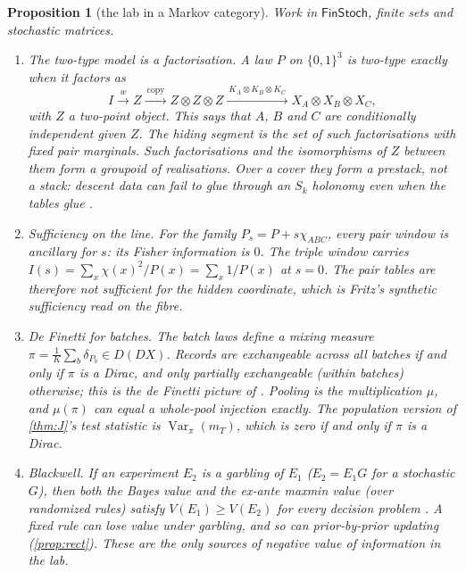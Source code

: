 \documentclass[11pt]{article}
\newtheorem{proposition}{Proposition}\newtheorem{corollary}{Corollary}\newtheorem{lemma}{Lemma}
\theoremstyle{definition}\newtheorem{definition}{Definition}\newtheorem{remark}{Remark}
\begin{document}
\begin{proposition}[the lab in a Markov category]\label{prop:markov}
Work in $\mathsf{FinStoch}$, finite sets and stochastic matrices.
\begin{enumerate}
\item[(1)] \emph{The two-type model is a factorisation.} A law $P$ on $\{0,1\}^3$ is two-type exactly when it factors as
  \[
  I\xrightarrow{\ w\ }Z\xrightarrow{\ \mathrm{copy}\ }Z\otimes Z\otimes Z\xrightarrow{\ K_A\otimes K_B\otimes K_C\ }X_A\otimes X_B\otimes X_C,
  \]
  with $Z$ a two-point object. This says that $A$, $B$ and $C$ are conditionally independent given $Z$. The hiding segment is the set of
  such factorisations with fixed pair marginals. Such factorisations and the isomorphisms of $Z$ between them form a groupoid of realisations. Over a cover they form a
  prestack, not a stack: descent data can fail to glue through an $S_k$ holonomy even when the tables glue
  \cite[Proposition ``the prestack of realisations'']{CoversCompanion}.
\item[(2)] \emph{Sufficiency on the line.} For the family $P_s=P+s\chi_{ABC}$, every pair window is ancillary for $s$: its Fisher
  information is $0$. The triple window carries $I(s)=\sum_x\chi(x)^2/P(x)=\sum_x1/P(x)$ at $s=0$. The pair tables are therefore not
  sufficient for the hidden coordinate, which is Fritz's synthetic sufficiency \cite{Fritz2020} read on the fibre.
\item[(3)] \emph{De Finetti for batches.} The batch laws define a mixing measure $\pi=\frac1K\sum_b\delta_{P_b}\in D(DX)$. Records are
  exchangeable across all batches if and only if $\pi$ is a Dirac, and only partially exchangeable (within batches) otherwise; this is the
  de Finetti picture of \cite{FritzGondaPerrone2021,ChenEtAl2025}. Pooling is the multiplication $\mu$, and $\mu(\pi)$ can equal a
  whole-pool injection exactly. The population version of \cref{thm:J}'s test statistic is $\operatorname{Var}_\pi(m_T)$, which is zero
  if and only if $\pi$ is a Dirac.
\item[(4)] \emph{Blackwell.} If an experiment $E_2$ is a garbling of $E_1$ ($E_2=E_1G$ for a stochastic $G$), then both the Bayes value and
  the ex-ante maxmin value (over randomized rules) satisfy $V(E_1)\ge V(E_2)$ for every decision problem
  \cite{FritzGondaPerroneRischel2023}. A \emph{fixed} rule can lose value under garbling, and so can prior-by-prior updating
  (\cref{prop:rect}). These are the only sources of negative value of information in the lab.
\end{enumerate}
\end{proposition}
\end{document}
